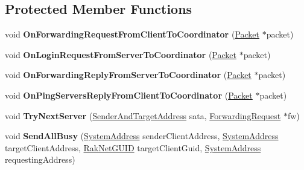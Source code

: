 \subsection*{Protected Member Functions}
\begin{DoxyCompactItemize}
\item 
\hypertarget{class_rak_net_1_1_u_d_p_proxy_coordinator_ae921afb0757c7af584365c4a26552dea}{void {\bfseries On\-Forwarding\-Request\-From\-Client\-To\-Coordinator} (\hyperlink{struct_rak_net_1_1_packet}{Packet} $\ast$packet)}\label{class_rak_net_1_1_u_d_p_proxy_coordinator_ae921afb0757c7af584365c4a26552dea}

\item 
\hypertarget{class_rak_net_1_1_u_d_p_proxy_coordinator_a32d7e7c0aca9b8d331375df8a84f8329}{void {\bfseries On\-Login\-Request\-From\-Server\-To\-Coordinator} (\hyperlink{struct_rak_net_1_1_packet}{Packet} $\ast$packet)}\label{class_rak_net_1_1_u_d_p_proxy_coordinator_a32d7e7c0aca9b8d331375df8a84f8329}

\item 
\hypertarget{class_rak_net_1_1_u_d_p_proxy_coordinator_ac93fd212dc01e02e9e3ed15dfb84218a}{void {\bfseries On\-Forwarding\-Reply\-From\-Server\-To\-Coordinator} (\hyperlink{struct_rak_net_1_1_packet}{Packet} $\ast$packet)}\label{class_rak_net_1_1_u_d_p_proxy_coordinator_ac93fd212dc01e02e9e3ed15dfb84218a}

\item 
\hypertarget{class_rak_net_1_1_u_d_p_proxy_coordinator_a6a16805323ad42f7c56fc1778ed2ac28}{void {\bfseries On\-Ping\-Servers\-Reply\-From\-Client\-To\-Coordinator} (\hyperlink{struct_rak_net_1_1_packet}{Packet} $\ast$packet)}\label{class_rak_net_1_1_u_d_p_proxy_coordinator_a6a16805323ad42f7c56fc1778ed2ac28}

\item 
\hypertarget{class_rak_net_1_1_u_d_p_proxy_coordinator_a96e27a251bdbaf1881536915b3942ef4}{void {\bfseries Try\-Next\-Server} (\hyperlink{struct_rak_net_1_1_u_d_p_proxy_coordinator_1_1_sender_and_target_address}{Sender\-And\-Target\-Address} sata, \hyperlink{struct_rak_net_1_1_u_d_p_proxy_coordinator_1_1_forwarding_request}{Forwarding\-Request} $\ast$fw)}\label{class_rak_net_1_1_u_d_p_proxy_coordinator_a96e27a251bdbaf1881536915b3942ef4}

\item 
\hypertarget{class_rak_net_1_1_u_d_p_proxy_coordinator_a00a005d55eaa3ed652e56499914ca906}{void {\bfseries Send\-All\-Busy} (\hyperlink{struct_rak_net_1_1_system_address}{System\-Address} sender\-Client\-Address, \hyperlink{struct_rak_net_1_1_system_address}{System\-Address} target\-Client\-Address, \hyperlink{struct_rak_net_1_1_rak_net_g_u_i_d}{Rak\-Net\-G\-U\-I\-D} target\-Client\-Guid, \hyperlink{struct_rak_net_1_1_system_address}{System\-Address} requesting\-Address)}\label{class_rak_net_1_1_u_d_p_proxy_coordinator_a00a005d55eaa3ed652e56499914ca906}


\end{DoxyCompactItemize}
